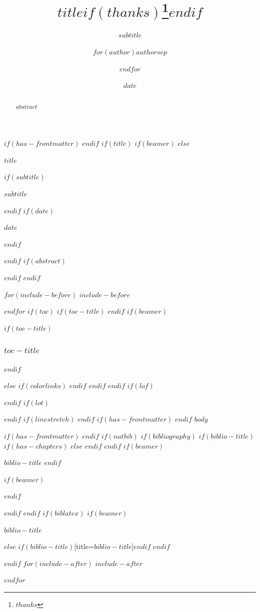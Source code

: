 \documentclass[
$if(fontsize)$
  $fontsize$,
$endif$
$if(papersize)$
  $papersize$paper,
$endif$
$if(beamer)$
  ignorenonframetext,
$if(handout)$
  handout,
$endif$
$if(aspectratio)$
  aspectratio=$aspectratio$,
$endif$
$endif$
$for(classoption)$
  $classoption$$sep$,
$endfor$
]{$documentclass$}
\title{$title$$if(thanks)$\thanks{$thanks$}$endif$}
\subtitle{$subtitle$}
\author{$for(author)$$author$$sep$ \and $endfor$}
\date{$date$}
\institute{$for(institute)$$institute$$sep$ \and $endfor$}
\newif\ifbibliography
\begin{document}
$if(has-frontmatter)$
\frontmatter
$endif$
$if(title)$
$if(beamer)$
\frame{\titlepage}
$else$
\begin{titlepage}
\centering
\vspace*{5cm}
{\Huge\bfseries $title$\par}
\vspace{1.2cm}
$if(subtitle)${\Large $subtitle$\par}$endif$
\vfill
$if(date)${\large $date$\par}$endif$
\vspace{1cm}
\end{titlepage}
$endif$
$if(abstract)$
\begin{abstract}
$abstract$
\end{abstract}
$endif$
$endif$

$for(include-before)$
$include-before$

$endfor$
$if(toc)$
$if(toc-title)$
\renewcommand*\contentsname{$toc-title$}
$endif$
$if(beamer)$
\begin{frame}[allowframebreaks]
$if(toc-title)$
  \frametitle{$toc-title$}
$endif$
  \tableofcontents[hideallsubsections]
\end{frame}
$else$
{
$if(colorlinks)$
\hypersetup{linkcolor=$if(toccolor)$$toccolor$$else$$endif$}
$endif$
\setcounter{tocdepth}{$toc-depth$}
\tableofcontents
}
\newpage
{}
\setcounter{page}{1}
$endif$
$endif$
$if(lof)$
\listoffigures
$endif$
$if(lot)$
\listoftables
$endif$
$if(linestretch)$
$endif$
$if(has-frontmatter)$
\mainmatter
$endif$
$body$

$if(has-frontmatter)$
\backmatter
$endif$
$if(natbib)$
$if(bibliography)$
$if(biblio-title)$
$if(has-chapters)$
\renewcommand\bibname{$biblio-title$}
$else$
\renewcommand\refname{$biblio-title$}
$endif$
$endif$
$if(beamer)$
\begin{frame}[allowframebreaks]{$biblio-title$}
  \bibliographytrue
$endif$
  
$if(beamer)$
\end{frame}
$endif$

$endif$
$endif$
$if(biblatex)$
$if(beamer)$
\begin{frame}[allowframebreaks]{$biblio-title$}
  \bibliographytrue
  \printbibliography[heading=none]
\end{frame}
$else$
\printbibliography$if(biblio-title)$[title=$biblio-title$]$endif$
$endif$

$endif$
$for(include-after)$
$include-after$

$endfor$
\end{document}
